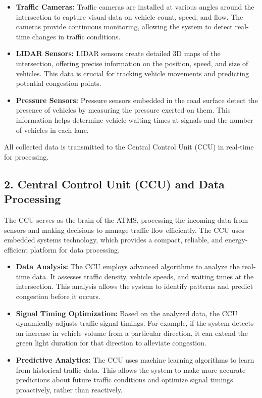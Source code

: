 \documentclass{scrreprt}
\begin{document}
\begin{itemize}
    \item \textbf{Traffic Cameras:} 
    Traffic cameras are installed at various angles around the intersection to capture visual data on vehicle count, speed, and flow. The cameras provide continuous monitoring, allowing the system to detect real-time changes in traffic conditions.

    \item \textbf{LIDAR Sensors:} 
    LIDAR sensors create detailed 3D maps of the intersection, offering precise information on the position, speed, and size of vehicles. This data is crucial for tracking vehicle movements and predicting potential congestion points.

    \item \textbf{Pressure Sensors:} 
    Pressure sensors embedded in the road surface detect the presence of vehicles by measuring the pressure exerted on them. This information helps determine vehicle waiting times at signals and the number of vehicles in each lane.
\end{itemize}

All collected data is transmitted to the Central Control Unit (CCU) in real-time for processing.

\subsection*{2. Central Control Unit (CCU) and Data Processing}

The CCU serves as the brain of the ATMS, processing the incoming data from sensors and making decisions to manage traffic flow efficiently. The CCU uses embedded systems technology, which provides a compact, reliable, and energy-efficient platform for data processing.

\begin{itemize}
    \item \textbf{Data Analysis:} 
    The CCU employs advanced algorithms to analyze the real-time data. It assesses traffic density, vehicle speeds, and waiting times at the intersection. This analysis allows the system to identify patterns and predict congestion before it occurs.

    \item \textbf{Signal Timing Optimization:} 
    Based on the analyzed data, the CCU dynamically adjusts traffic signal timings. For example, if the system detects an increase in vehicle volume from a particular direction, it can extend the green light duration for that direction to alleviate congestion.

    \item \textbf{Predictive Analytics:} 
    The CCU uses machine learning algorithms to learn from historical traffic data. This allows the system to make more accurate predictions about future traffic conditions and optimize signal timings proactively, rather than reactively.
\end{itemize}
\end{document}
